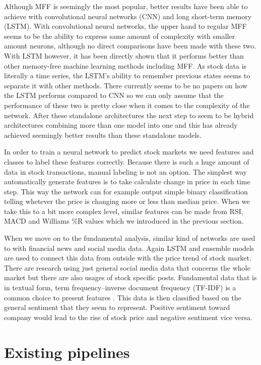 Although MFF is seemingly the most popular, better results have been able to achieve with convolutional neural networks (CNN) and long short-term memory (LSTM).
With convolutional neural networks, the upper hand to regular MFF seems to be the ability to express same amount of complexity with smaller amount neurons, although no direct comparisons have been made with these two.
With LSTM however, it has been directly shown that it performs better than other memory-free machine learning methods including MFF.
As stock data is literally a time series, the LSTM's ability to remember previous states seems to separate it with other methods.
There currently seems to be no papers on how the LSTM performs compared to CNN so we can only assume that the performance of these two is pretty close when it comes to the complexity of the network.
After these standalone architectures the next step to seem to be hybrid architectures combining more than one model into one and this has already achieved seemingly better results than these standalone models. \cite{senguptaa}

In order to train a neural network to predict stock markets we need features and classes to label these features correctly.
Because there is such a huge amount of data in stock transactions, manual labeling is not an option.
The simplest way automatically generate features is to take calculate change in price in each time step.
This way the network can for example output simple binary classification telling whetever the price is changing more or less than median price. \cite{fischer}
When we take this to a bit more complex level, similar features can be made from RSI, MACD and Williams \%R values which we introduced in the previous section. \cite{serez}

When we move on to the fundamental analysis, similar kind of networks are used to with financial news and social media data.
Again LSTM and ensemble models are used to connect this data from outside with the price trend of stock market.
There are research using just general social media data that concerns the whole market but there are also usages of stock specific posts.
Fundamental data that is in textual form, term frequency–inverse document frequency (TF-IDF) is a common choice to present features \cite{chungho}.
This data is then classified based on the general sentiment that they seem to represent.
Positive sentiment toward company would lead to the rise of stock price and negative sentiment vice versa.

\section{Existing pipelines}

